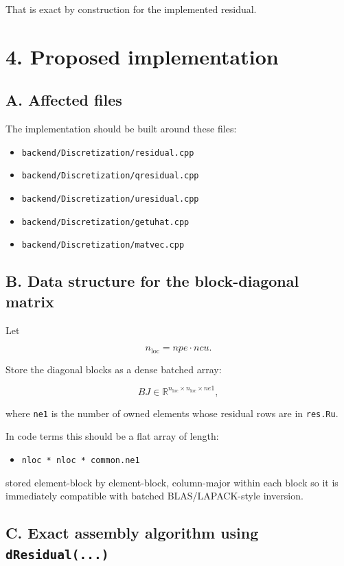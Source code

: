\documentclass[11pt]{article}
\begin{document}
That is exact by construction for the implemented residual.

\section*{4. Proposed implementation}

\subsection*{A. Affected files}

The implementation should be built around these files:

\begin{itemize}[leftmargin=*]
\item \texttt{backend/Discretization/residual.cpp}
\item \texttt{backend/Discretization/qresidual.cpp}
\item \texttt{backend/Discretization/uresidual.cpp}
\item \texttt{backend/Discretization/getuhat.cpp}
\item \texttt{backend/Discretization/matvec.cpp}
\end{itemize}

\subsection*{B. Data structure for the block-diagonal matrix}

Let

\[
n_{\mathrm{loc}} = npe \cdot ncu.
\]

Store the diagonal blocks as a dense batched array:

\[
BJ \in \mathbb{R}^{n_{\mathrm{loc}} \times n_{\mathrm{loc}} \times ne1},
\]

where \texttt{ne1} is the number of owned elements whose residual rows are in
\texttt{res.Ru}.

In code terms this should be a flat array of length:

\begin{itemize}[leftmargin=*]
\item \texttt{nloc * nloc * common.ne1}
\end{itemize}

stored element-block by element-block, column-major within each block so it is
immediately compatible with batched BLAS/LAPACK-style inversion.

\subsection*{C. Exact assembly algorithm using \texttt{dResidual(...)}}
\end{document}
